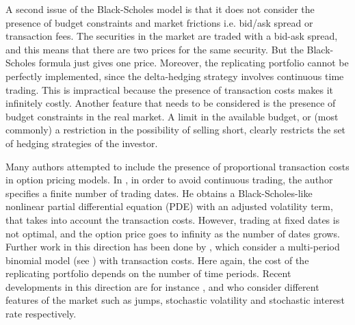 A second issue of the Black-Scholes model is that it does not consider the presence of budget constraints and market frictions i.e.
bid/ask spread or transaction fees.
The securities in the market are traded with a bid-ask spread, and this means that there are two prices for the
same security. But the Black-Scholes formula just gives one price.
Moreover, the replicating portfolio cannot be perfectly implemented,
since the delta-hedging strategy involves continuous time trading. 
This is impractical because the presence of transaction costs makes it infinitely costly.
Another feature that needs to be considered is the presence of budget constraints in the real market. 
A limit in the available budget, or (most commonly) a restriction in the possibility of 
selling short, clearly restricts the set of hedging strategies of the investor.

Many authors attempted to include the presence of proportional transaction costs in option pricing models.
In \cite{Le85}, in order to avoid continuous trading, the author specifies 
a finite number of trading dates. He obtains a Black-Scholes-like
nonlinear partial differential equation (PDE) with an adjusted volatility term, that takes into account the transaction costs. 
However, trading at fixed dates is not optimal, and the option price goes to infinity as the number of dates grows.
Further work in this direction has been done by \cite{BoVo92}, which consider a multi-period binomial model (see \cite{CRR79})
with transaction costs. Here again, the cost of the replicating portfolio depends on the number of time periods. 
Recent developments in this direction are for instance \cite{Mocio07}, \cite{FlMaSe14} and \cite{Sengu14} 
who consider different features of the market such as jumps, stochastic volatility and stochastic interest rate respectively.  

